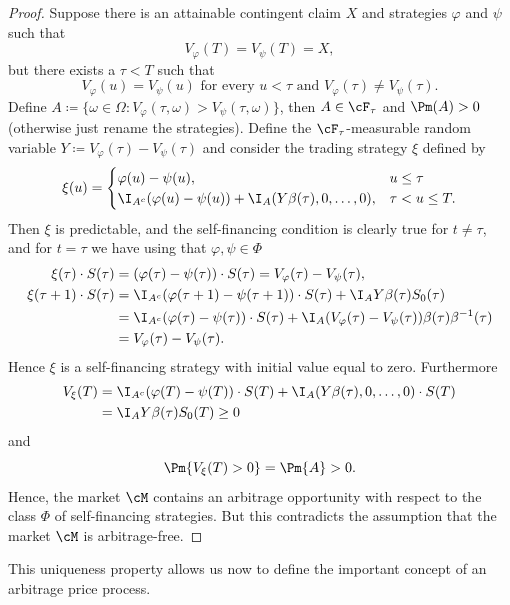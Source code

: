 \begin{proof}
	Suppose there is an attainable contingent claim \(X\) and strategies \(\varphi\) and \(\psi\) such that
	\[
		V_{\varphi}(T) = V_{\psi}(T) = X,
	\]
	but there exists a \(\tau < T\) such that
	\[
		V_{\varphi}(u) = V_{\psi}(u) \text{ for every } u < \tau \text{ and } V_{\varphi}(\tau) \neq V_{\psi}(\tau).
	\]
	Define \(A \coloneqq \{ \omega \in \Omega : V_{\varphi}(\tau, \omega) > V_{\psi}(\tau, \omega) \}\), then \(A \in \cF_{\tau}\) and \(\Pm(A) > 0\) (otherwise just rename the strategies). Define the \(\cF_{\tau}\)-measurable random variable \(Y \coloneqq V_{\varphi}(\tau) - V_{\psi}(\tau)\) and consider the trading strategy \(\xi\) defined by
	\[
		\xi(u) = \begin{cases}
			\varphi(u) - \psi(u),                                             & u \leq \tau      \\
			\I_{A^c}(\varphi(u) - \psi(u)) + \I_A(Y\beta(\tau), 0, \dots, 0), & \tau < u \leq T.
		\end{cases}
	\]
	Then \(\xi\) is predictable, and the self-financing condition  is clearly true for \(t \neq \tau\), and for \(t = \tau\) we have using that \(\varphi, \psi \in \Phi\)
	\begin{align*}
		\xi(\tau) \cdot S(\tau)     & = (\varphi(\tau) - \psi(\tau)) \cdot S(\tau) = V_{\varphi}(\tau) - V_{\psi}(\tau),                                            \\
		\xi(\tau + 1) \cdot S(\tau) & = \I_{A^c}(\varphi(\tau + 1) - \psi(\tau + 1)) \cdot S(\tau) + \I_A Y \beta(\tau) S_0(\tau)                                   \\
		                            & = \I_{A^c}(\varphi(\tau) - \psi(\tau)) \cdot S(\tau) + \I_A (V_{\varphi}(\tau) - V_{\psi}(\tau)) \beta(\tau) \beta^{-1}(\tau) \\
		                            & = V_{\varphi}(\tau) - V_{\psi}(\tau).
	\end{align*}
	Hence \(\xi\) is a self-financing strategy with initial value equal to zero. Furthermore
	\[
		\begin{aligned}
			V_{\xi}(T) & = \I_{A^c}(\varphi(T) - \psi(T)) \cdot S(T) + \I_A (Y \beta(\tau), 0, \dots, 0) \cdot S(T) \\
			           & = \I_A Y \beta(\tau) S_0(T) \geq 0
		\end{aligned}
	\]
	and
	\[
		\Pm\{V_{\xi}(T) > 0\} = \Pm\{A\} > 0.
	\]
	Hence, the market \(\cM\) contains an arbitrage opportunity with respect to the class \(\Phi\) of self-financing strategies. But this contradicts the assumption that the market \(\cM\) is arbitrage-free.
\end{proof}
This uniqueness property allows us now to define the important concept of an arbitrage price process.

